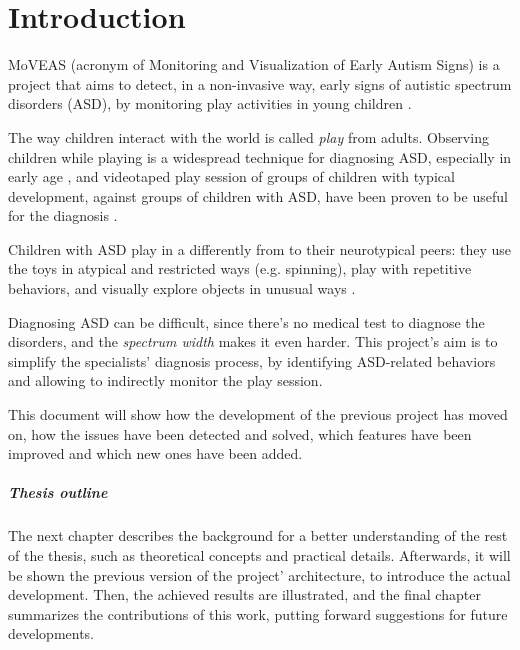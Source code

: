 \chapter{Introduction}
MoVEAS (acronym of Monitoring and Visualization of Early Autism Signs) is a project that aims to detect, in a non-invasive way, early signs of autistic spectrum disorders (ASD), by monitoring play activities in young children \cite{Bon20, Lan19}.
\bigbreak

The way children interact with the world is called \textit{play} from adults. Observing children while playing is a widespread technique for diagnosing ASD, especially in early age \cite{Ozo08}, and videotaped play session of groups of children with typical development, against groups of children with ASD, have been proven to be useful for the diagnosis \cite{Bar05, Ozo08, Wet10}.

Children with ASD play in a differently from to their neurotypical peers: they use the toys in atypical and restricted ways (e.g. spinning), play with repetitive behaviors, and visually explore objects in unusual ways \cite{Bru07, Ozo08}.

Diagnosing ASD can be difficult, since there's no medical test to diagnose the disorders, and the \textit{spectrum width} makes it even harder. This project's aim is to simplify the specialists' diagnosis process, by identifying ASD-related behaviors and allowing to indirectly monitor the play session.
\bigbreak

This document will show how the development of the previous project has moved on, how the issues have been detected and solved, which features have been improved and which new ones have been added.
\bigbreak

\paragraph{Thesis outline}
The next chapter describes the background for a better understanding of the rest of the thesis, such as theoretical concepts and practical details. Afterwards, it will be shown the previous version of the project' architecture, to introduce the actual development. Then, the achieved results are illustrated, and the final chapter summarizes the contributions of this work, putting forward suggestions for future developments.
